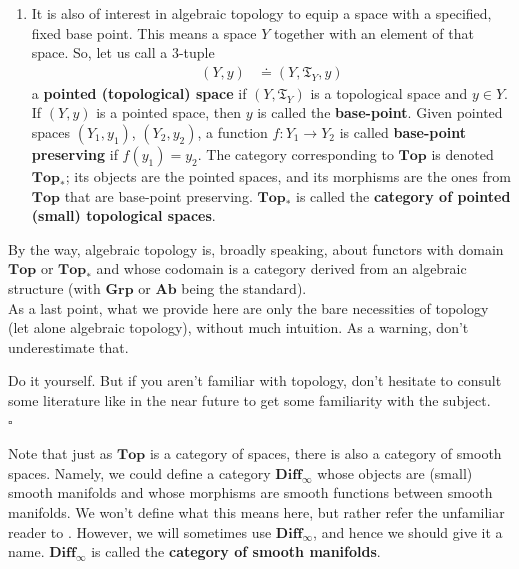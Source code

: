 \begin{exa}
\begin{enumerate}
\item[$\bullet$]
It is also of interest in algebraic topology to equip a space with a specified, fixed base point.
This means a space $Y$ together with an element of that space.
So, let us call a $3$-tuple
\begin{align*}
  (Y,y)
  &\doteq
  (Y,\mathfrak{T}_{Y},y)
\end{align*}
a \textbf{pointed (topological) space} if $(Y,\mathfrak{T}_{Y})$ is a topological space and $y \in Y$.
If $(Y,y)$ is a pointed space, then $y$ is called the \textbf{base-point}.
Given pointed spaces $(Y_{1},y_{1})$, $(Y_{2},y_{2})$, a function $f \colon Y_{1} \rightarrow Y_{2}$ is called \textbf{base-point preserving} if $f(y_{1}) = y_{2}$.
The category corresponding to $\mathbf{Top}$ is denoted $\mathbf{Top}_{\ast}$; its objects are the pointed spaces, and its morphisms are the ones from $\mathbf{Top}$ that are base-point preserving.
$\mathbf{Top}_{\ast}$ is called the \textbf{category of pointed (small) topological spaces}.
\end{enumerate}
By the way, algebraic topology is, broadly speaking, about functors with domain $\mathbf{Top}$ or $\mathbf{Top}_{\ast}$ and whose codomain is a category derived from an algebraic structure (with $\mathbf{Grp}$ or $\mathbf{Ab}$ being the standard).
\\
As a last point, what we provide here are only the bare necessities of topology (let alone algebraic topology), without much intuition.
As a warning, don't underestimate that.
\end{exa}
\begin{prf}
Do it yourself.
But if you aren't familiar with topology, don't hesitate to consult some literature like \cite{273ba834} in the near future to get some familiarity with the subject.
\\
\phantom{proven}
\hfill
$\square$
\end{prf}
Note that just as $\mathbf{Top}$ is a category of spaces, there is also a category of {\glqq}smooth spaces{\grqq}.
Namely, we could define a category $\mathbf{Diff}_{\infty}$ whose objects are (small) smooth manifolds and whose morphisms are smooth functions between smooth manifolds.
We won't define what this means here, but rather refer the unfamiliar reader to \cite{797789bc}.
However, we will sometimes use $\mathbf{Diff}_{\infty}$, and hence we should give it a name.
$\mathbf{Diff}_{\infty}$ is called the \textbf{category of smooth manifolds}.
\\\\
